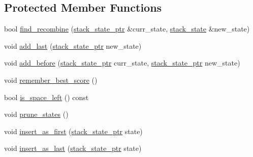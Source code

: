 \subsection*{Protected Member Functions}
\begin{DoxyCompactItemize}
\item 
bool \hyperlink{classuva_1_1smt_1_1bpbd_1_1server_1_1decoder_1_1stack_1_1stack__level_add73733b755d8835ca3b5c2339736451}{find\+\_\+recombine} (\hyperlink{namespaceuva_1_1smt_1_1bpbd_1_1server_1_1decoder_1_1stack_ab08047a5fae45b1c4311bd5d5aa2c4fc}{stack\+\_\+state\+\_\+ptr} \&curr\+\_\+state, \hyperlink{namespaceuva_1_1smt_1_1bpbd_1_1server_1_1decoder_1_1stack_a30416dfcace69691af43f9f44a076f7e}{stack\+\_\+state} \&new\+\_\+state)
\item 
void \hyperlink{classuva_1_1smt_1_1bpbd_1_1server_1_1decoder_1_1stack_1_1stack__level_a4a33e33ce484e82bae8315e8d3b25308}{add\+\_\+last} (\hyperlink{namespaceuva_1_1smt_1_1bpbd_1_1server_1_1decoder_1_1stack_ab08047a5fae45b1c4311bd5d5aa2c4fc}{stack\+\_\+state\+\_\+ptr} new\+\_\+state)
\item 
void \hyperlink{classuva_1_1smt_1_1bpbd_1_1server_1_1decoder_1_1stack_1_1stack__level_a552d8f4cfe4ff1680623bf747e578b73}{add\+\_\+before} (\hyperlink{namespaceuva_1_1smt_1_1bpbd_1_1server_1_1decoder_1_1stack_ab08047a5fae45b1c4311bd5d5aa2c4fc}{stack\+\_\+state\+\_\+ptr} curr\+\_\+state, \hyperlink{namespaceuva_1_1smt_1_1bpbd_1_1server_1_1decoder_1_1stack_ab08047a5fae45b1c4311bd5d5aa2c4fc}{stack\+\_\+state\+\_\+ptr} new\+\_\+state)
\item 
void \hyperlink{classuva_1_1smt_1_1bpbd_1_1server_1_1decoder_1_1stack_1_1stack__level_abbaa5c1fade73f6643f6d31795a0fc2e}{remember\+\_\+best\+\_\+score} ()
\item 
bool \hyperlink{classuva_1_1smt_1_1bpbd_1_1server_1_1decoder_1_1stack_1_1stack__level_a0a550b351762d3d456535f33df7b9fd5}{is\+\_\+space\+\_\+left} () const 
\item 
void \hyperlink{classuva_1_1smt_1_1bpbd_1_1server_1_1decoder_1_1stack_1_1stack__level_a1312ea6fdd24e8d91c81564525e7edaf}{prune\+\_\+states} ()
\item 
void \hyperlink{classuva_1_1smt_1_1bpbd_1_1server_1_1decoder_1_1stack_1_1stack__level_ac487fa956e94d7840ac4190137502d51}{insert\+\_\+as\+\_\+first} (\hyperlink{namespaceuva_1_1smt_1_1bpbd_1_1server_1_1decoder_1_1stack_ab08047a5fae45b1c4311bd5d5aa2c4fc}{stack\+\_\+state\+\_\+ptr} state)
\item 
void \hyperlink{classuva_1_1smt_1_1bpbd_1_1server_1_1decoder_1_1stack_1_1stack__level_a65a44b9204f548253eae6b3816a39af7}{insert\+\_\+as\+\_\+last} (\hyperlink{namespaceuva_1_1smt_1_1bpbd_1_1server_1_1decoder_1_1stack_ab08047a5fae45b1c4311bd5d5aa2c4fc}{stack\+\_\+state\+\_\+ptr} state)

\end{DoxyCompactItemize}
